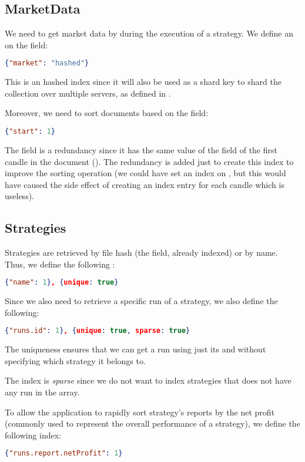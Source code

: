 \subsection{MarketData}

We need to get market data by  during the execution of a strategy.
We define an  on the  field:

\begin{lstlisting}[language=json]
{"market": "hashed"}
\end{lstlisting}

This is an hashed index since it will also be used as a shard key to shard the
collection over multiple servers, as defined in .

Moreover, we need to sort documents based on the  field:

\begin{lstlisting}[language=json]
{"start": 1}
\end{lstlisting}

The  field is a redundancy since it has the same value of the
 field of the first candle in the document (). The
redundancy is added just to create this index to improve the sorting operation
(we could have set an index on , but this would have caused the
side effect of creating an index entry for each candle which is useless).

\subsection{Strategies}

Strategies are retrieved by file hash (the  field, already indexed)
or by name. Thus, we define the following :

\begin{lstlisting}[language=json]
{"name": 1}, {unique: true}
\end{lstlisting}

Since we also need to retrieve a specific run of a strategy, we also define the
following:

\begin{lstlisting}[language=json]
{"runs.id": 1}, {unique: true, sparse: true}
\end{lstlisting}

The uniqueness ensures that we can get a run using just its  and
without specifying which strategy it belongs to.

The index is \emph{sparse} since we do not want to index strategies that does
not have any run in the  array.

To allow the application to rapidly sort strategy's reports by the net profit
(commonly used to represent the overall performance of a strategy), we define
the following index:

\begin{lstlisting}[language=json]
{"runs.report.netProfit": 1}
\end{lstlisting}
